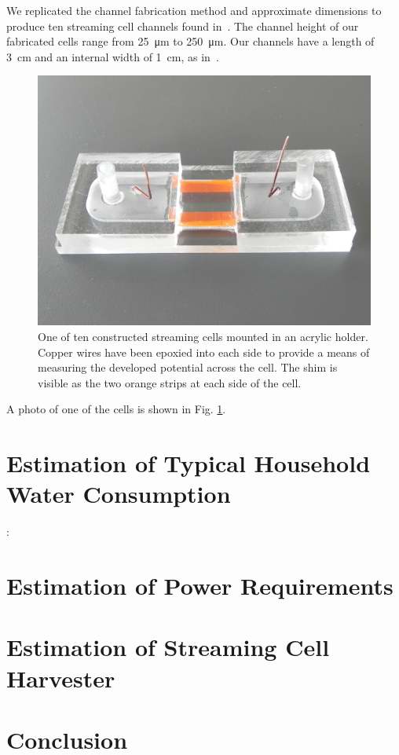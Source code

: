 \documentclass[10pt,final,journal]{IEEEtran}
\begin{document}
    We replicated the channel fabrication method and approximate dimensions to produce ten streaming cell channels found in~\cite{Gu2000}.
    The channel height of our fabricated cells range from \SI{25}{\micro\metre} to \SI{250}{\micro\metre}.
    Our channels have a length of \SI{3}{\centi\metre} and an internal width of \SI{1}{\centi\metre}, as in~\cite{Gu2000}.
    \begin{figure}
        \begin{center}
        \includegraphics[width=\linewidth]{Photo_streamingPotential_Assembly_Step3.JPG}
        \end{center}
        \caption{One of ten constructed streaming cells mounted in an acrylic holder. Copper wires have been epoxied into each side to provide a means of measuring the developed potential across the cell. The shim is visible as the two orange strips at each side of the cell.}
        \label{fig:cell}
    \end{figure}
    A photo of one of the cells is shown in Fig. \ref{fig:cell}.


    \section{Estimation of Typical Household Water Consumption}:
    \label{sect:waterConsumption}
    \section{Estimation of Power Requirements}
    \label{sect:powerRequirements}
    \section{Estimation of Streaming Cell Harvester}
    \label{sect:harvesterSize}
    \section{Conclusion}
    
    
\end{document}
